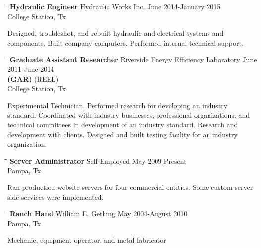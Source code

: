 \documentclass{res}
\begin{document}
\begin{resume}
   \begin{tabbing}
   \hspace{2.5in}\= \hspace{2.6in}\= \kill %
    {\bf Hydraulic Engineer} \>Hydraulic Works Inc.     \>June 2014-January 2015\\
    \>College Station, Tx
   \end{tabbing}\vspace{-20pt}      %
   Designed, troubleshot, and rebuilt hydraulic and electrical systems and components. Built company computers. Performed internal technical support.

   \begin{tabbing}
   \hspace{2.5in}\= \hspace{2.6in}\= \kill %
    {\bf Graduate Assistant Researcher} \>Riverside Energy Efficiency Laboratory     \>June 2011-June 2014\\
    {\bf (GAR)}                    \>(REEL)\\	\>College Station, Tx
   \end{tabbing}\vspace{-20pt}      %
   	Experimental Technician. Performed research for developing an industry standard. Coordinated with industry businesses, professional organizations, and technical committees in development of an industry standard. Research and development with clients. Designed and built testing facility for an industry organization.
   \begin{tabbing}
   \hspace{2.5in}\= \hspace{2.6in}\= \kill %
    {\bf Server Administrator} \>Self-Employed \> May 2009-Present\\
                          \>Pampa, Tx
   \end{tabbing}\vspace{-20pt}
   	Ran production website servers for four commercial entities. Some custom server side services were implemented.
   \begin{tabbing}
   \hspace{2.5in}\= \hspace{2.6in}\= \kill %
    {\bf Ranch Hand} \>William E. Gething \> May 2004-August 2010 \\
                          \>Pampa, Tx
   \end{tabbing}\vspace{-20pt}
   Mechanic, equipment operator, and metal fabricator


\end{resume}
\end{document}
